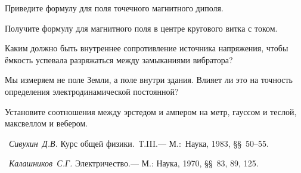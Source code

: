 \begin{lab:questions}
    \item Приведите формулу для поля точечного магнитного диполя.

    \item Получите формулу для магнитного поля в центре кругового витка с током.

    \item Каким должно быть внутреннее сопротивление источника напряжения, чтобы ёмкость успевала разряжаться между замыканиями
    вибратора?

    \item Мы измеряем не поле Земли, а поле внутри здания. Влияет ли это на точность определения электродинамической постоянной?

    \item Установите соотношения между эрстедом и ампером на метр, гауссом и теслой, максвеллом и вебером.
\end{lab:questions}

\begin{lab:literature}
    \item~\emph{Сивухин~Д.В.} Курс общей физики.~Т.III.--- М.:~Наука, 1983, \S\S~50--55.

    \item~\emph{Калашников~С.Г.} Электричество.--- М.: Наука, 1970, \S\S~83, 89, 125.
\end{lab:literature}
